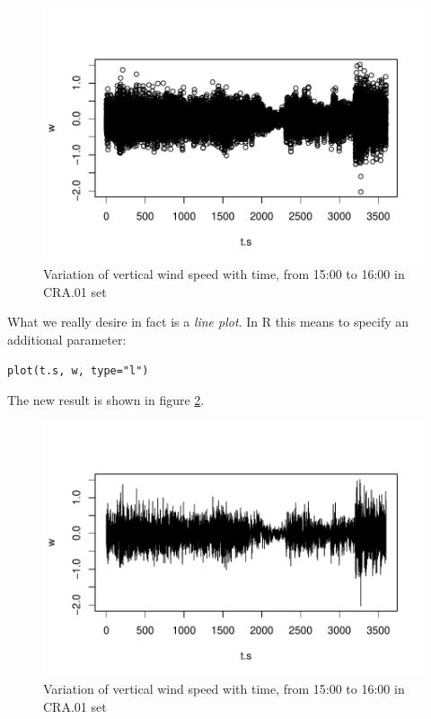 \documentclass[a4paper,10pt]{book}
\begin{document}
\begin{figure}[htp]
 \centering
 \begin{center}
 \includegraphics[scale=1.1,keepaspectratio=true]{./diagrams/SimplePlot0.pdf}
 \end{center}
 \caption{Variation of vertical wind speed with time, from 15:00 to 16:00 in CRA.01 set}
 \label{fig:Simple plot 0}
\end{figure}

What we really desire in fact is a \emph{line plot}. In R this means to specify an additional parameter:

\begin{verbatim}
plot(t.s, w, type="l")
\end{verbatim}

The new result is shown in figure \ref{fig:Simple plot 1}.

\begin{figure}[htp]
 \centering
 \begin{center}
 \includegraphics[scale=1.1,keepaspectratio=true]{./diagrams/SimplePlot1.pdf}
 \end{center}
 \caption{Variation of vertical wind speed with time, from 15:00 to 16:00 in CRA.01 set}
 \label{fig:Simple plot 1}
\end{figure}
\end{document}
